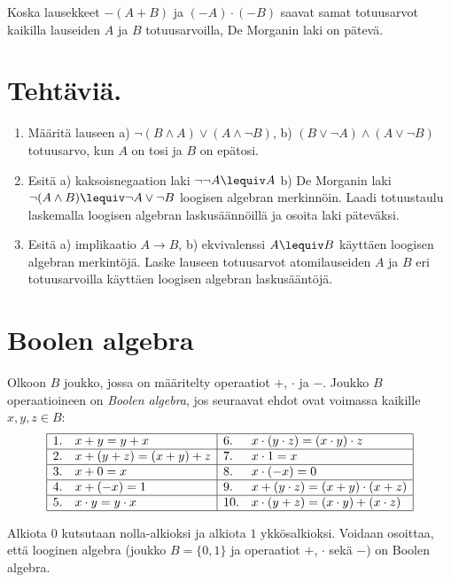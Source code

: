 Koska lausekkeet $- (A + B)$ ja $( - A ) \cdot ( - B )$ saavat
samat totuusarvot kaikilla lauseiden $A$ ja $B$ totuusarvoilla,
De Morganin laki on pätevä.


\newpage

\section*{Tehtäviä.}
\begin{enumerate}
\item Määritä lauseen a) $\lnot(B\land A)\lor (A\land\lnot B)$, b) $(B\lor \lnot A)\land (A\lor \lnot B)$
 totuusarvo, kun $A$ on tosi ja $B$ on epätosi.

\item Esitä a) kaksoisnegaation laki $\lnot \lnot A \lequiv A$ b) De Morganin laki $\lnot(A\land B)\lequiv \lnot A\lor \lnot B$ loogisen algebran merkinnöin. Laadi totuustaulu laskemalla loogisen algebran laskusäännöillä ja osoita laki päteväksi.


\item Esitä a) implikaatio $A\to B$, b) ekvivalenssi $A\lequiv B$ käyttäen loogisen algebran merkintöjä. Laske lauseen totuusarvot atomilauseiden $A$ ja $B$ eri totuusarvoilla käyttäen loogisen algebran laskusääntöjä.
\end{enumerate}

\newpage

\section{Boolen algebra}

Olkoon $B$ joukko, jossa on määritelty operaatiot $+$, $\cdot$ ja $-$.  Joukko $B$ operaatioineen on {\em Boolen algebra}, jos seuraavat ehdot ovat voimassa kaikille $x,y,z\in B$:
\[
\begin{array}{|ll|ll|}
\hline
1. & x+y=y+x  & 6. & x\cdot(y\cdot z)=(x\cdot y)\cdot z \\ 
\hline
2. & x+(y+z)=(x+y)+z& 7. & x\cdot1=x \\
\hline
3. & x+0=x & 8. & x\cdot (-x)=0 \\
\hline
4. & x+(-x)=1   &9. & x+(y\cdot z)=(x+y)\cdot (x+z)\\
\hline
5. &x\cdot y=y\cdot x& 10. &x\cdot(y+z)=(x\cdot y)+(x\cdot z) \\
\hline
\end{array}
\]

Alkiota $0$ kutsutaan nolla-alkioksi ja alkiota $1$ ykkösalkioksi.
Voidaan osoittaa, että looginen algebra (joukko $B=\{0,1\}$ ja operaatiot $+$, $\cdot$ sekä $-$) on Boolen algebra.

